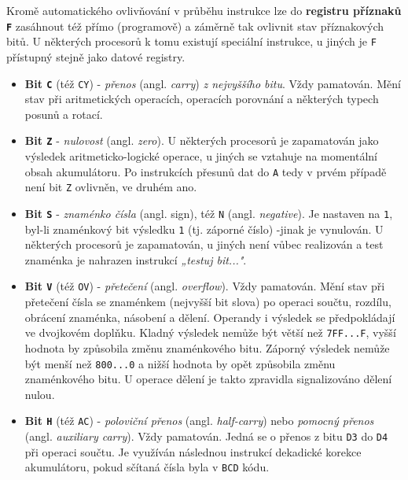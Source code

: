        Kromě automatického ovlivňování v průběhu instrukce lze do \textbf{registru příznaků 
        \texttt{F}} zasáhnout též přímo (programově) a záměrně tak ovlivnit stav příznakových bitů. 
        U některých procesorů k tomu existují speciální instrukce, u jiných je \texttt{F} přístupný 
        stejně jako datové registry.
        \begin{itemize}\addtolength{\itemsep}{-0.5\baselineskip}
          \item \textbf{Bit \texttt{C}} (též \texttt{CY}) - \emph{přenos} (angl. \emph{carry})  
                \emph{z nejvyššího bitu}. Vždy pamatován. Mění stav při aritmetických operacích, 
                operacích porovnání a některých typech posunů a rotací.
         
          \item \textbf{Bit \texttt{Z}} - \emph{nulovost} (angl. \emph{zero}). U některých      
                procesorů je  zapamatován jako výsledek aritmeticko-logické operace, u jiných se 
                vztahuje na momentální  obsah akumulátoru. Po instrukcích přesunů dat do \texttt{A} 
                tedy v prvém případě není bit \texttt{Z} ovlivněn, ve druhém ano.
        
          \item \textbf{Bit \texttt{S}} - \emph{znaménko čísla} (angl. sign), též \texttt{N} (angl. 
                \emph{negative}). Je nastaven na \texttt{1}, byl-li znaménkový bit výsledku 
                \texttt{1} (tj.  záporné číslo) -jinak je vynulován. U některých procesorů je 
                zapamatován, u jiných není vůbec realizován a test znaménka je nahrazen instrukcí 
                \emph{„testuj bit..."}.
        
          \item \textbf{Bit \texttt{V}} (též \texttt{OV}) - \emph{přetečení} (angl.   
                \emph{overflow}). Vždy pamatován. Mění stav při přetečení čísla se znaménkem 
                (nejvyšší bit slova) po operaci součtu, rozdílu, obrácení znaménka, násobení a 
                dělení. Operandy i výsledek se předpokládají ve dvojkovém doplňku. Kladný výsledek 
                nemůže být větší než \texttt{7FF...F}, vyšší hodnota by způsobila změnu 
                znaménkového bitu. Záporný výsledek nemůže být menší než \texttt{800...0} a 
                nižší hodnota by opět způsobila změnu znaménkového bitu. U operace dělení je takto 
                zpravidla signalizováno dělení nulou.
        
          \item \textbf{Bit \texttt{H}} (též \texttt{AC}) - \emph{poloviční přenos} (angl.  
                \emph{half-carry}) nebo \emph{pomocný přenos} (angl. \emph{auxiliary carry}). Vždy 
                pamatován. Jedná se o přenos z bitu \texttt{D3} do \texttt{D4} při operaci součtu. 
                Je využíván následnou instrukcí dekadické korekce akumulátoru, pokud sčítaná čísla 
                byla v \texttt{BCD} kódu.
        

\end{itemize}
